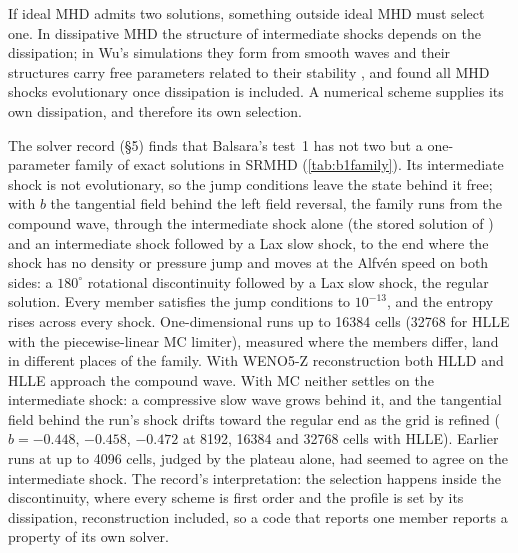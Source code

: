 \documentclass[11pt,a4paper,oneside,openany]{book}
\newcommand{\textcite}{\citet}
\newcommand{\parencite}{\citep}
\theoremstyle{definition}
\theoremstyle{plain}
\theoremstyle{remark}
\begin{document}
If ideal MHD admits two solutions, something outside ideal MHD must select one. In
dissipative MHD the structure of intermediate shocks depends on the dissipation; in Wu's
simulations they form from smooth waves and their structures carry free parameters related
to their stability \parencite{Wu1990}, and \textcite{InoueInutsuka2007} found all MHD shocks
evolutionary once dissipation is included. A numerical scheme supplies its own
dissipation, and therefore its own selection.

\begin{keybox}
The solver record (\S5) finds that Balsara's test~1 has not two but a one-parameter family
of exact solutions in SRMHD (\cref{tab:b1family}). Its intermediate shock is not
evolutionary, so the jump conditions leave the state behind it free; with $b$ the
tangential field behind the left field reversal, the family runs from the compound wave,
through the intermediate shock alone (the stored solution of
\textcite{GiacomazzoRezzolla2006}) and an intermediate shock followed by a Lax slow shock,
to the end where the shock has no density or pressure jump and moves at the Alfvén speed on
both sides: a $180^\circ$ rotational discontinuity followed by a Lax slow shock, the
regular solution. Every member satisfies the jump conditions to $10^{-13}$, and the
entropy rises across every shock. One-dimensional runs up to 16384 cells (32768 for HLLE
with the piecewise-linear MC limiter), measured where the members differ, land in different
places of the family. With WENO5-Z reconstruction both HLLD and HLLE approach the compound
wave. With MC neither settles on the intermediate shock: a compressive slow wave grows
behind it, and the tangential field behind the run's shock drifts toward the regular end as
the grid is refined ($b=-0.448$, $-0.458$, $-0.472$ at 8192, 16384 and 32768 cells with
HLLE). Earlier runs at up to 4096 cells, judged by the plateau alone, had seemed to agree on
the intermediate shock. The record's interpretation: the selection happens inside the
discontinuity, where every scheme is first order and the profile is set by its dissipation,
reconstruction included, so a code that reports one member reports a property of its own
solver.
\end{keybox}
\end{document}
